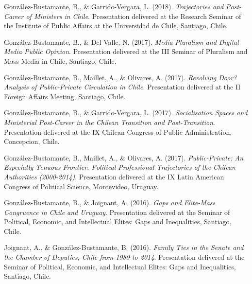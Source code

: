 \begin{publications}
\begin{benumerate}{66}
\item{\small González-Bustamante, B., \& Garrido-Vergara, L. (2018). {\itshape Trajectories and Post-Career of Ministers in Chile}. Presentation delivered at the Research Seminar of the Institute of Public Affairs at the Universidad de Chile, Santiago, Chile.}\vspace{1mm}

\item{\small González-Bustamante, B., \& Del Valle, N. (2017). {\itshape Media Pluralism and Digital Media Public Opinion}. Presentation delivered at the III Seminar of Pluralism and Mass Media in Chile, Santiago, Chile.}\vspace{1mm}

\item{\small González-Bustamante, B., Maillet, A., \& Olivares, A. (2017). {\itshape Revolving Door? Analysis of Public-Private Circulation in Chile}. Presentation delivered at the II Foreign Affairs Meeting, Santiago, Chile.}\vspace{1mm}

\item{\small González-Bustamante, B., \& Garrido-Vergara, L. (2017). {\itshape Socialisation Spaces and Ministerial Post-Career in the Chilean Transition and Post-Transition}. Presentation delivered at the IX Chilean Congress of Public Administration, Concepcion, Chile.}\vspace{1mm}

\item{\small González-Bustamante, B., Maillet, A., \& Olivares, A. (2017). {\itshape Public-Private: An Especially Tenuous Frontier. Political-Professional Trajectories of the Chilean Authorities (2000-2014)}. Presentation delivered at the IX Latin American Congress of Political Science, Montevideo, Uruguay.}\vspace{1mm}

\item{\small González-Bustamante, B., \& Joignant, A. (2016). {\itshape Gaps and Elite-Mass Congruence in Chile and Uruguay}. Presentation delivered at the Seminar of Political, Economic, and Intellectual Elites: Gaps and Inequalities, Santiago, Chile.}\vspace{1mm}

\item{\small Joignant, A., \& González-Bustamante, B. (2016). {\itshape Family Ties in the Senate and the Chamber of Deputies, Chile from 1989 to 2014}. Presentation delivered at the Seminar of Political, Economic, and Intellectual Elites: Gaps and Inequalities, Santiago, Chile.}\vspace{1mm}


\end{benumerate}
\end{publications}
